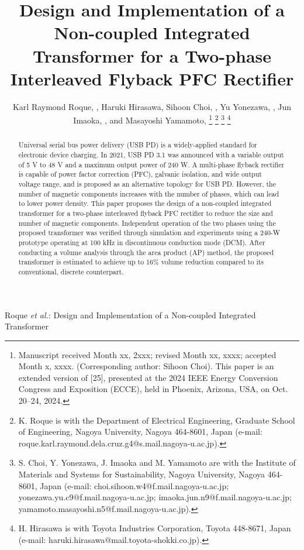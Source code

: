 \documentclass[lettersize,journal]{IEEEtran}
\begin{document}
\title{Design and Implementation of a Non-coupled Integrated Transformer for a Two-phase Interleaved Flyback PFC Rectifier}

\author{Karl Raymond Roque, , Haruki Hirasawa, Sihoon Choi, , Yu Yonezawa, , Jun Imaoka, , and Masayoshi Yamamoto, 
\thanks{Manuscript received Month xx, 2xxx; revised Month xx, xxxx; accepted Month x, xxxx. (Corresponding author: Sihoon Choi). This paper is an extended version of [25], presented at the 2024 IEEE Energy Conversion Congress and Exposition (ECCE), held in Phoenix, Arizona, USA, on Oct. 20–24, 2024.}
\thanks{K. Roque is with the Department of Electrical Engineering, Graduate School of Engineering, Nagoya University, Nagoya 464-8601, Japan (e-mail: roque.karl.raymond.dela.cruz.g4@s.mail.nagoya-u.ac.jp).}
\thanks{S. Choi, Y. Yonezawa, J. Imaoka and M. Yamamoto are with the Institute of Materials and Systems for Sustainability, Nagoya University, Nagoya 464-8601, Japan (e-mail: choi.sihoon.w4@f.mail.nagoya-u.ac.jp; yonezawa.yu.c9@f.mail.nagoya-u.ac.jp; imaoka.jun.n9@f.mail.nagoya-u.ac.jp; yamamoto.masayoshi.n5@f.mail.nagoya-u.ac.jp).}
\thanks{H. Hirasawa is with Toyota Industries Corporation, Toyota 448-8671, Japan (e-mail: haruki.hirasawa@mail.toyota-shokki.co.jp).}}

%
{Roque \MakeLowercase{\textit{et al.}}: Design and Implementation of a Non-coupled Integrated Transformer}

\maketitle

\begin{abstract}
Universal serial bus power delivery (USB PD) is a widely-applied standard for electronic device charging. In 2021, USB PD 3.1 was announced with a variable output of 5 V to 48 V and a maximum output power of 240 W. A multi-phase flyback rectifier is capable of power factor correction {\color{red}(PFC)}, galvanic isolation, and wide output voltage range, and is proposed as an alternative topology for USB PD. However, the number of magnetic components increases with the number of phases, which can lead to lower power density. This paper proposes the design of a non-coupled integrated transformer for a two-phase interleaved flyback PFC rectifier to reduce the size and number of magnetic components. Independent operation of the two phases using the proposed transformer was verified through simulation and experiments using a 240-W prototype operating at 100 kHz in discontinuous conduction mode (DCM). After conducting a volume analysis through the area product (AP) method, the proposed transformer is estimated to achieve up to {\color{red}16\%} volume reduction compared to its conventional{\color{red}, discrete} counterpart.
\end{abstract}
\end{document}
